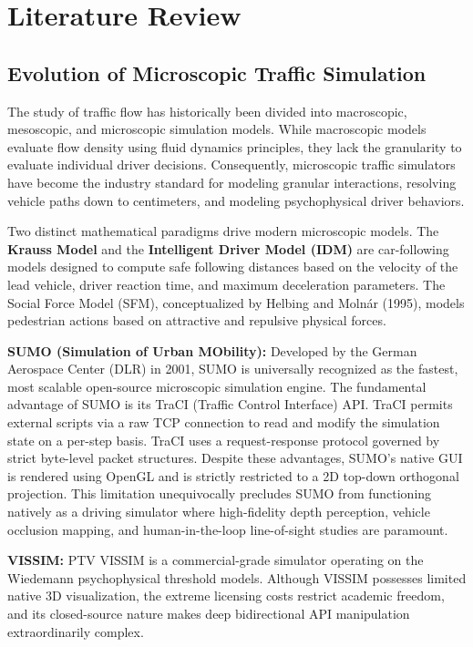 \chapter{Literature Review}

\section{Evolution of Microscopic Traffic Simulation}

The study of traffic flow has historically been divided into macroscopic, mesoscopic, and microscopic simulation models. While macroscopic models evaluate flow density using fluid dynamics principles, they lack the granularity to evaluate individual driver decisions. Consequently, microscopic traffic simulators have become the industry standard for modeling granular interactions, resolving vehicle paths down to centimeters, and modeling psychophysical driver behaviors. 

Two distinct mathematical paradigms drive modern microscopic models. The \textbf{Krauss Model} and the \textbf{Intelligent Driver Model (IDM)} are car-following models designed to compute safe following distances based on the velocity of the lead vehicle, driver reaction time, and maximum deceleration parameters. The Social Force Model (SFM), conceptualized by Helbing and Moln\'{a}r (1995), models pedestrian actions based on attractive and repulsive physical forces.

\textbf{SUMO (Simulation of Urban MObility):} Developed by the German Aerospace Center (DLR) in 2001, SUMO is universally recognized as the fastest, most scalable open-source microscopic simulation engine. The fundamental advantage of SUMO is its TraCI (Traffic Control Interface) API. TraCI permits external scripts via a raw TCP connection to read and modify the simulation state on a per-step basis. TraCI uses a request-response protocol governed by strict byte-level packet structures. Despite these advantages, SUMO’s native GUI is rendered using OpenGL and is strictly restricted to a 2D top-down orthogonal projection. This limitation unequivocally precludes SUMO from functioning natively as a driving simulator where high-fidelity depth perception, vehicle occlusion mapping, and human-in-the-loop line-of-sight studies are paramount.

\textbf{VISSIM:} PTV VISSIM is a commercial-grade simulator operating on the Wiedemann psychophysical threshold models. Although VISSIM possesses limited native 3D visualization, the extreme licensing costs restrict academic freedom, and its closed-source nature makes deep bidirectional API manipulation extraordinarily complex.

